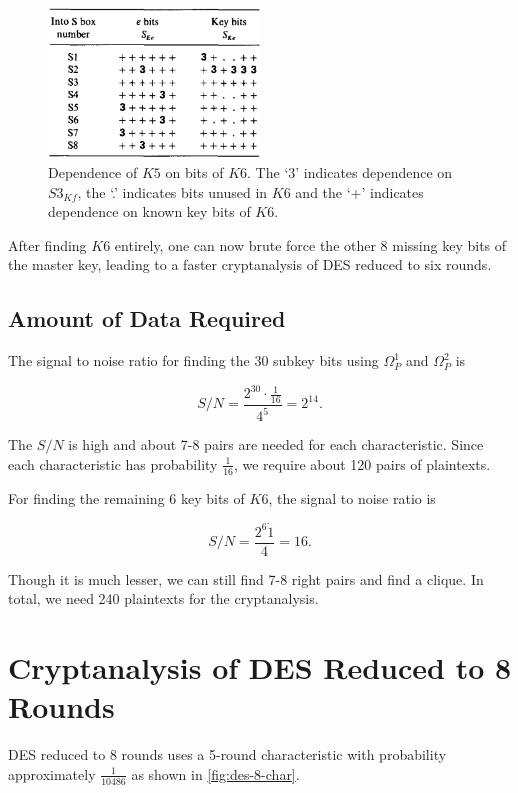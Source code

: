 \documentclass[twoside]{article}
\begin{document}
\begin{figure}[!ht]
    \centering
    \includegraphics[width=0.5\textwidth]{images/des_k5.png}
    \caption{Dependence of \(K5\) on bits of \(K6\). The `3' indicates 
    dependence on \(S3_{Kf}\), the `.' indicates bits unused in \(K6\) and the 
    `+' indicates dependence on known key bits of \(K6\).}
    \label{fig:des-k5}
\end{figure}

After finding \(K6\) entirely, one can now brute force the other 8 missing key 
bits of the master key, leading to a faster cryptanalysis of DES reduced to 
six rounds.

\subsection{Amount of Data Required}
The signal to noise ratio for finding the 30 subkey bits using \(\Omega_P^1\) 
and \(\Omega_P^2\) is

\begin{equation}
    S/N = \frac{2^{30} \cdot \frac{1}{16}}{4^5} = 2^{14}.
    \label{eq:des-6-sn1}
\end{equation}

The \(S/N\) is high and about 7-8 pairs are needed for each characteristic. 
Since each characteristic has probability \(\frac{1}{16}\), we require about 
120 pairs of plaintexts.

For finding the remaining 6 key bits of \(K6\), the signal to noise ratio is

\begin{equation}
    S/N = \frac{2^6 \dot 1}{4} = 16.
    \label{eq:des-6-sn2}
\end{equation}

Though it is much lesser, we can still find 7-8 right pairs and find a clique.
In total, we need 240 plaintexts for the cryptanalysis.

\section{Cryptanalysis of DES Reduced to 8 Rounds}
DES reduced to 8 rounds uses a 5-round characteristic with probability 
approximately \(\frac{1}{10486}\) as shown in \autoref{fig:des-8-char}.
\end{document}

